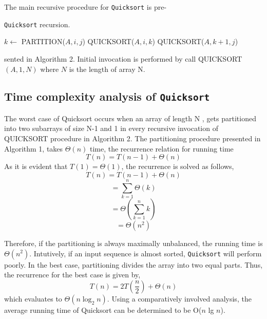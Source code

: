 \documentclass[12pt,twocolumn]{article}
\begin{document}
\par The main recursive procedure for \texttt{Quicksort} is pre-
\begin{algorithm}
\caption{\texttt{Quicksort} recursion.}
\begin{algorithmic}[1]
 \newline
    \State $k \leftarrow$ PARTITION($A,i,j$)
    \State QUICKSORT($A,i,k$)
    \State QUICKSORT($A,k+1,j$)
    \EndIf
\EndProcedure
\end{algorithmic}
\end{algorithm}
sented in Algorithm 2. Initial invocation is performed by call QUICKSORT$(A, 1,N )$ where $N$ is the length of array N.
\subsection{Time complexity analysis of \texttt{Quicksort}}
The worst case of Quicksort occurs when an array of length N , gets partitioned into two subarrays of size N-1 and 1 in every recursive invocation of QUICKSORT procedure in Algorithm 2. The partitioning procedure presented in Algorithm 1, takes $\Theta(n)$ time, the recurrence relation for running time
\begin{equation*}
    T(n) = T (n-1) + \Theta(n)
\end{equation*}
As it is evident that $T(1) = \Theta(1)$, the recurrence is solved as follows,
\begin{equation*}
    T(n) = T (n-1) + \Theta(n)
\end{equation*}
\begin{equation*}
    = \sum_{k=1}^{n} \Theta(k)
\end{equation*}
\begin{equation*}
    = \Theta\left(\sum_{k=1}^{n} k\right)
\end{equation*}
\begin{equation*}
    = \Theta (n^2)
\end{equation*}
\par 
Therefore, if the partitioning is always maximally unbalanced, the running time is $\Theta(n^2)$. Intutively, if an input sequence is almost sorted, \texttt{Quicksort} will perform poorly. In the best case, partitioning divides the array into two equal parts. Thus, the recurrence for the best case is given by,
\begin{equation*}
    T(n) = 2T\left(\frac{n}{2}\right) + \Theta(n)
\end{equation*}
which evaluates to $\Theta(n \log_2 n)$. Using a comparatively involved analysis, the average running time of Quicksort can be determined to be O($n$ lg $n$).
\end{document}
